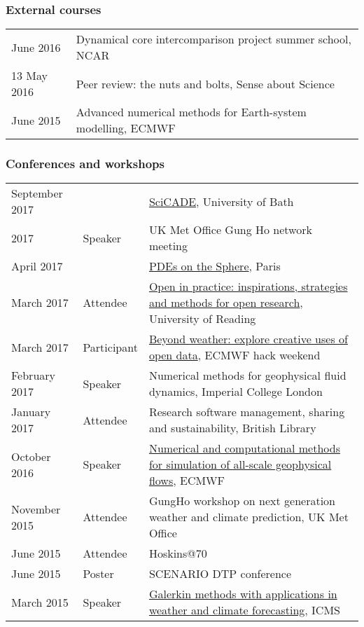 \documentclass[a4paper,11pt]{article}
\begin{document}
\subsubsection*{External courses}
\begin{tabular}{l l}
June 2016 & Dynamical core intercomparison project summer school, NCAR \\
13 May 2016 & Peer review: the nuts and bolts, Sense about Science \\
June 2015 & Advanced numerical methods for Earth-system modelling, ECMWF \\
\end{tabular}

\subsubsection*{Conferences and workshops}
\begin{tabularx}{\linewidth}{l l X}
September 2017 & & \href{https://sites.google.com/site/scicade2017/}{SciCADE}, University of Bath \\
2017 & Speaker & UK Met Office Gung Ho network meeting \\
April 2017 & & \href{https://forge.ipsl.jussieu.fr/heat/wiki/PDEs2017}{PDEs on the Sphere}, Paris \\
March 2017 & Attendee & \href{https://blogs.reading.ac.uk/open-research/open-in-practice-inspirations-strategies-and-methods-for-open-research/}{Open in practice: inspirations, strategies and methods for open research}, University of Reading \\
March 2017 & Participant & \href{https://www.eventbrite.co.uk/e/opendatahack-ecmwf-beyond-weather-explore-creative-uses-of-open-data-tickets-28733656139}{Beyond weather: explore creative uses of open data}, ECMWF hack weekend \\
February 2017 & Speaker & Numerical methods for geophysical fluid dynamics, Imperial College London \\
January 2017 & Attendee & Research software management, sharing and sustainability, British Library \\
October 2016 & Speaker & \href{http://www.ecmwf.int/en/learning/workshops-and-seminars/workshop-numerical-and-computational-methods-simulation-all-scale-geophysical-flows}{Numerical and computational methods for simulation of all-scale geophysical flows}, ECMWF \\
November 2015 & Attendee & GungHo workshop on next generation weather and climate prediction, UK Met Office \\
June 2015 & Attendee & Hoskins@70 \\
June 2015 & Poster & SCENARIO DTP conference \\
March 2015 & Speaker & \href{http://www.icms.org.uk/workshop.php?id=334}{Galerkin methods with applications in weather and climate forecasting}, ICMS \\
\end{tabularx}
\end{document}
